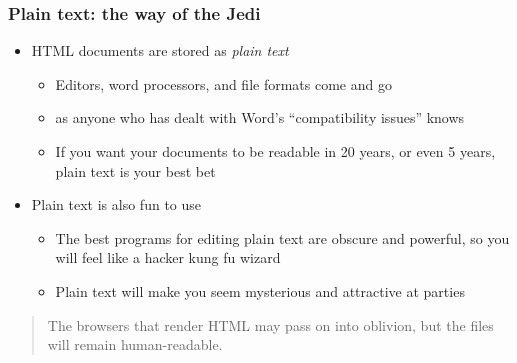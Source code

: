 \documentclass[11pt,ignorenonframetext,aspectratio=169]{beamer}
\begin{document}
\begin{frame}\frametitle{Plain text: the way of the Jedi}

\begin{itemize}[<+->]

\item
  HTML documents are stored as \emph{plain text}

  \begin{itemize}[<+->]
  
  \item
    Editors, word processors, and file formats come and go
  \item
    as anyone who has dealt with Word's ``compatibility issues'' knows
  \item
    If you want your documents to be readable in 20 years, or even 5
    years, plain text is your best bet
  \end{itemize}
\item
  Plain text is also fun to use

  \begin{itemize}[<+->]
  
  \item
    The best programs for editing plain text are obscure and powerful,
    so you will feel like a hacker kung fu wizard
  \item
    Plain text will make you seem mysterious and attractive at parties
  \end{itemize}
\end{itemize}

\begin{quote}
The browsers that render HTML may pass on into oblivion, but the files
will remain human-readable.
\end{quote}

\end{frame}
\end{document}
